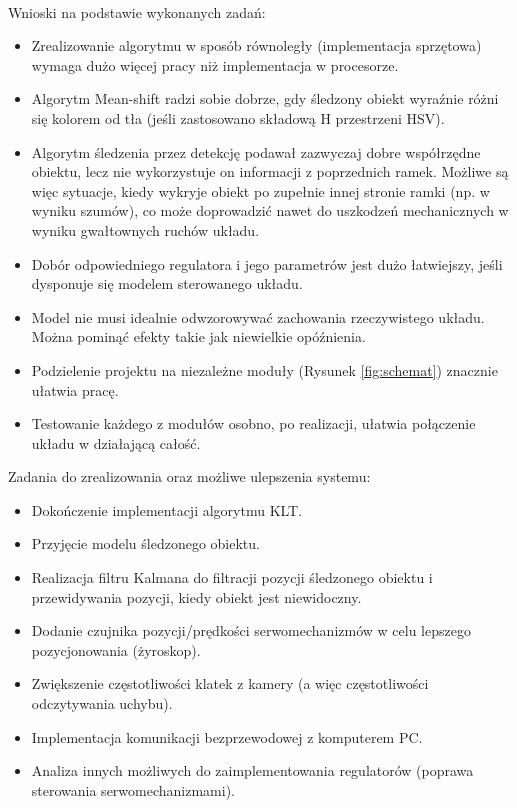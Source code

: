 \paragraph*{}
Wnioski na podstawie wykonanych zadań:
\begin{itemize}
\item Zrealizowanie algorytmu w sposób równoległy (implementacja sprzętowa) wymaga dużo więcej pracy niż implementacja w procesorze.
\item Algorytm Mean-shift radzi sobie dobrze, gdy śledzony obiekt wyraźnie różni się kolorem od tła (jeśli zastosowano składową H przestrzeni HSV).
\item Algorytm śledzenia przez detekcję podawał zazwyczaj dobre współrzędne obiektu, lecz nie wykorzystuje on informacji z poprzednich ramek. Możliwe są więc sytuacje, kiedy wykryje obiekt po zupełnie innej stronie ramki (np. w wyniku szumów), co może doprowadzić nawet do uszkodzeń mechanicznych w wyniku gwałtownych ruchów układu.
\item Dobór odpowiedniego regulatora i jego parametrów jest dużo łatwiejszy, jeśli dysponuje się modelem sterowanego układu.
\item Model nie musi idealnie odwzorowywać zachowania rzeczywistego układu. Można pominąć efekty takie jak niewielkie opóźnienia.
\item Podzielenie projektu na niezależne moduły (Rysunek \ref{fig:schemat}) znacznie ułatwia pracę.
\item Testowanie każdego z modułów osobno, po realizacji, ułatwia połączenie układu w działającą całość.
\end{itemize}

Zadania do zrealizowania oraz możliwe ulepszenia systemu:
\begin{itemize}
\item Dokończenie implementacji algorytmu KLT.
\item Przyjęcie modelu śledzonego obiektu.
\item Realizacja filtru Kalmana do filtracji pozycji śledzonego obiektu i przewidywania pozycji, kiedy obiekt jest niewidoczny.
\item Dodanie czujnika pozycji/prędkości serwomechanizmów w celu lepszego pozycjonowania (żyroskop).
\item Zwiększenie częstotliwości klatek z kamery (a więc częstotliwości odczytywania uchybu).
\item Implementacja komunikacji bezprzewodowej z komputerem PC.
\item Analiza innych możliwych do zaimplementowania regulatorów (poprawa sterowania serwomechanizmami).
\end{itemize}